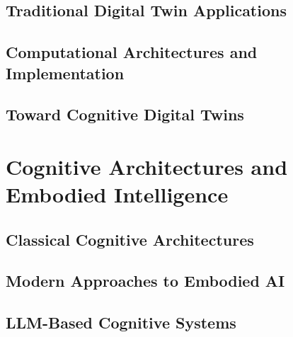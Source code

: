 \subsection{Traditional Digital Twin Applications}

\subsection{Computational Architectures and Implementation}

\subsection{Toward Cognitive Digital Twins}

\section{Cognitive Architectures and Embodied Intelligence}

\subsection{Classical Cognitive Architectures}

\subsection{Modern Approaches to Embodied AI}

\subsection{LLM-Based Cognitive Systems}

